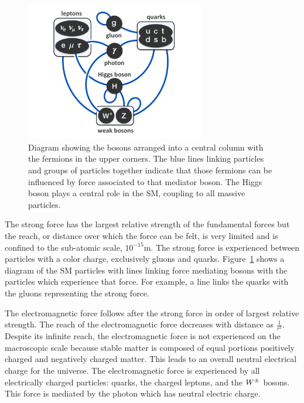 \begin{figure}[htbp]
\centering
     \includegraphics[width=0.7\textwidth]{introduction/plots/elementary_particle_interactions_SM.pdf}
     \caption{
Diagram showing the bosons arranged into a central column with the fermions in the
upper corners. The blue lines linking particles and groups of particles together
indicate that those fermions can be influenced by force associated to that mediator
boson. The Higgs boson plays a central role in the SM, coupling to all massive particles.
     }
     \label{fig:sm_forces}
\end{figure}

The strong force has the largest relative strength of the fundamental forces but
the reach, or distance over which the force can be felt, is very limited and is 
confined to the sub-atomic scale, $10^{-15}$m. The strong force is experienced
between particles with a color charge, exclusively gluons and quarks.
Figure~\ref{fig:sm_forces} shows a diagram of the SM particles with
lines linking force mediating bosons with the particles which experience that force.
For example, a line links the quarks with the gluons representing the
strong force.

The electromagnetic force follows after the strong force in order of largest relative
strength. The reach of the electromagnetic force decreases with
distance as $\frac{1}{r^{2}}$. Despite its infinite reach, the electromagnetic 
force is not experienced on the macroscopic scale because stable matter is composed
of equal portions positively charged and negatively charged matter. This leads to
an overall neutral electrical charge for the universe. The electromagnetic force is experienced by all
electrically charged particles: quarks, the charged leptons, and the $W^{\pm}$ bosons.
This force is mediated by the photon which has neutral electric charge.

